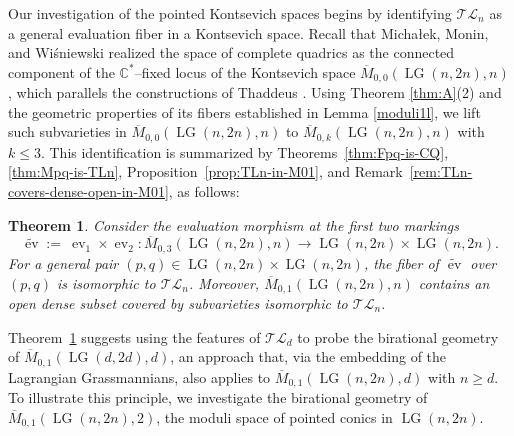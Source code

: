 \documentclass[10pt]{amsart}
\theoremstyle{definition}
\newcommand{\Mbar}{\overline{M}}
\newcommand{\LG}{\operatorname{LG}}
\newcommand{\ev}{\operatorname{ev}}
\newcommand{\TL}{\mathcal{TL}}
\theoremstyle{plain} %
\newtheorem{theoremABC}{Theorem}
\begin{document}



Our investigation of the pointed Kontsevich spaces begins by identifying $\TL_n$ as a general evaluation fiber in a Kontsevich space. Recall that Micha{\l}ek, Monin, and Wi\'sniewski \cite[Corollary 3.11]{MMW21} realized the space of complete quadrics
as the connected component of the $\mathbb C^*$--fixed locus of the Kontsevich space $\Mbar_{0,0}(\LG(n,2n),n)$, which parallels the constructions of Thaddeus \cite{Th1}. Using Theorem \ref{thm:A}\textup{(2)} and the geometric properties of its fibers established in Lemma \ref{moduli1l}, we lift such subvarieties in $\Mbar_{0,0}(\LG(n,2n),n)$ to $\Mbar_{0,k}(\LG(n,2n),n)$ with $k\leq 3$. This identification is summarized by Theorems~\ref{thm:Fpq-is-CQ}, \ref{thm:Mpq-is-TLn}, Proposition~\ref{prop:TLn-in-M01}, and Remark~\ref{rem:TLn-covers-dense-open-in-M01}, as follows:
\begin{theoremABC}\label{thm:B}
Consider the evaluation morphism at the first two markings
\[
\widetilde{\ev}:=\ \ev_1\times \ev_2\colon
\overline{M}_{0,3}(\LG(n,2n),n)\longrightarrow \LG(n,2n)\times \LG(n,2n).
\]
For a general pair $(p,q)\in \LG(n,2n)\times \LG(n,2n)$, the fiber of $\widetilde{\ev}$ over $(p,q)$ is isomorphic to $\TL_n$. Moreover, $\overline{M}_{0,1}(\LG(n,2n),n)$ contains an open dense subset covered by subvarieties isomorphic to $\TL_n$. 
\end{theoremABC}



Theorem~\ref{thm:B} suggests using the features of $\TL_d$ to probe the birational geometry of $\overline{M}_{0,1}(\LG(d,2d),d)$, an approach that,  via the embedding of the Lagrangian Grassmannians, also applies to $\overline{M}_{0,1}(\LG(n,2n),d)$ with $n\geq d$. To illustrate this principle, we investigate the birational geometry of $\overline{M}_{0,1}(\LG(n,2n),2)$, the moduli space of pointed conics in $\LG(n,2n)$. 
\end{document}
